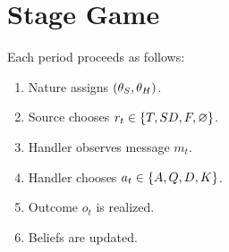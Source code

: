 \section{Stage Game}

Each period proceeds as follows:

\begin{enumerate}
    \item Nature assigns $(\theta_S, \theta_H)$.
    \item Source chooses $r_t \in \{T, SD, F, \varnothing\}$.
    \item Handler observes message $m_t$.
    \item Handler chooses $a_t \in \{A, Q, D, K\}$.
    \item Outcome $o_t$ is realized.
    \item Beliefs are updated.
\end{enumerate}
